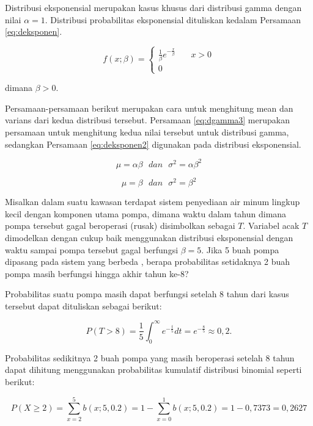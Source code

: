 \documentclass[]{book}
\begin{document}
Distribusi eksponensial merupakan kasus khusus dari distribusi gamma
dengan nilai \(\alpha=1\). Distribusi probabilitas eksponensial
dituliskan kedalam Persamaan \eqref{eq:deksponen}.

\begin{equation}
f\left(x;\beta \right) =
  \begin{cases}
    \frac{1}{\beta}e^{-\frac{x}{\beta}}       & \quad x>0\\
    0                   & \quad\text{}
    \end{cases}
 \label{eq:deksponen}
\end{equation}

dimana \(\beta>0\).

Persamaan-persamaan berikut merupakan cara untuk menghitung mean dan
varians dari kedua distribusi tersebut. Persamaan \eqref{eq:dgamma3}
merupakan persamaan untuk menghitung kedua nilai tersebut untuk
distribusi gamma, sedangkan Persamaan \eqref{eq:deksponen2} digunakan pada
distribusi eksponensial.

\begin{equation}
   \mu=\alpha\beta\ \ \ dan\ \ \ \sigma^2=\alpha\beta^2
  \label{eq:dgamma3}
\end{equation}

\begin{equation}
   \mu=\beta\ \ \ dan\ \ \ \sigma^2=\beta^2
  \label{eq:deksponen2}
\end{equation}

Misalkan dalam suatu kawasan terdapat sistem penyediaan air minum
lingkup kecil dengan komponen utama pompa, dimana waktu dalam tahun
dimana pompa tersebut gagal beroperasi (rusak) disimbolkan sebagai
\(T\). Variabel acak \(T\) dimodelkan dengan cukup baik menggunakan
distribusi eksponensial dengan waktu sampai pompa tersebut gagal
berfungsi \(\beta=5\). Jika 5 buah pompa dipasang pada sistem yang
berbeda , berapa probabilitas setidaknya 2 buah pompa masih berfungsi
hingga akhir tahun ke-8?

Probabilitas suatu pompa masih dapat berfungsi setelah 8 tahun dari
kasus tersebut dapat dituliskan sebagai berikut:

\[
P\left(T>8\right)=\frac{1}{5}\int_0^{\infty}e^{-\frac{t}{5}}dt=e^{-\frac{8}{5}}\approx0,2.
\]

Probabilitas sedikitnya 2 buah pompa yang masih beroperasi setelah 8
tahun dapat dihitung menggunakan probabilitas kumulatif distribusi
binomial seperti berikut:

\[
P\left(X\ge2\right)=\sum_{x=2}^5b\left(x;5,0.2\right)=1-\sum_{x=0}^1b\left(x;5,0.2\right)=1-0,7373=0,2627
\]
\end{document}
